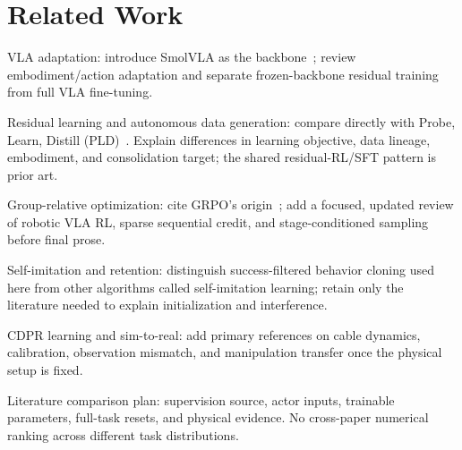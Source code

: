 \section{Related Work}\label{sec:related}
\begin{outline}
\item VLA adaptation: introduce SmolVLA as the backbone~\cite{smolvla}; review embodiment/action adaptation and separate frozen-backbone residual training from full VLA fine-tuning.
\item Residual learning and autonomous data generation: compare directly with Probe, Learn, Distill (PLD)~\cite{pld}. Explain differences in learning objective, data lineage, embodiment, and consolidation target; the shared residual-RL/SFT pattern is prior art.
\item Group-relative optimization: cite GRPO's origin~\cite{deepseekmath}; add a focused, updated review of robotic VLA RL, sparse sequential credit, and stage-conditioned sampling before final prose.
\item Self-imitation and retention: distinguish success-filtered behavior cloning used here from other algorithms called self-imitation learning; retain only the literature needed to explain initialization and interference.
\item CDPR learning and sim-to-real: add primary references on cable dynamics, calibration, observation mismatch, and manipulation transfer once the physical setup is fixed.
\item Literature comparison plan: supervision source, actor inputs, trainable parameters, full-task resets, and physical evidence. No cross-paper numerical ranking across different task distributions.
\end{outline}
